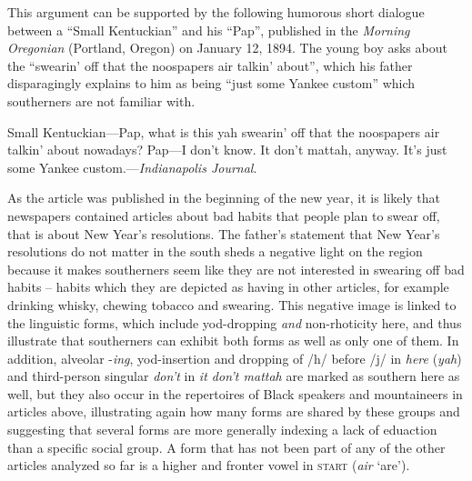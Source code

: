 This argument can be supported by the following humorous short dialogue between a “Small Kentuckian” and his “Pap”, published in the \emph{Morning Oregonian} (Portland, Oregon) on January 12, 1894. The young boy asks about the “swearin’ off that the noospapers air talkin’ about”, which his father disparagingly explains to him as being “just some Yankee custom” which southerners are not familiar with.

\begin{ipquote}
Small Kentuckian—Pap, what is this yah swearin’ off that the noospapers air talkin’ about nowadays? Pap—I don’t know. It don’t mattah, anyway. It’s just some Yankee custom.—\textit{Indianapolis Journal}.
\end{ipquote}


As the article was published in the beginning of the new year, it is likely that newspapers contained articles about bad habits that people plan to swear off, that is about New Year’s resolutions. The father’s statement that New Year’s resolutions do not matter in the south sheds a negative light on the region because it makes southerners seem like they are not interested in swearing off bad habits – habits which they are depicted as having in other articles, for example drinking whisky, chewing tobacco and swearing. This negative image is linked to the linguistic forms, which include yod-dropping \emph{and} non-rhoticity here, and thus illustrate that southerners can exhibit both forms as well as only one of them. In addition, alveolar -\emph{ing}, yod-insertion and dropping of /h/ before /j/ in \emph{here} (\emph{yah}) and third-person singular \emph{don’t} in \emph{it don’t mattah} are marked as southern here as well, but they also occur in the repertoires of Black speakers and mountaineers in articles above, illustrating again how many forms are shared by these groups and suggesting that several forms are more generally indexing a lack of eduaction than a specific social group. A form that has not been part of any of the other articles analyzed so far is a higher and fronter vowel in \textsc{start} (\emph{air} ‘are’).


